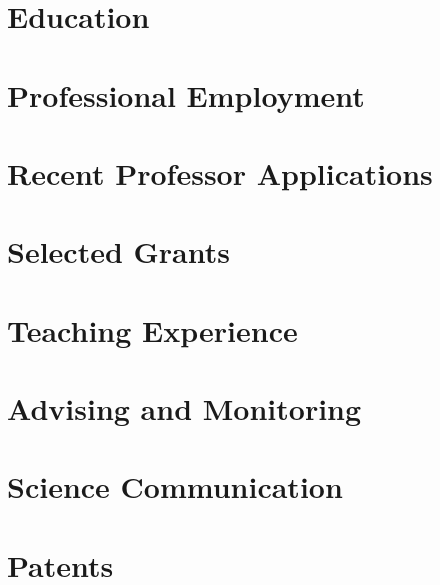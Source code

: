 \documentclass[a4paper,12pt]{article}
\begin{document}



\section{Education}



\section{Professional Employment}



\section{Recent Professor Applications}

%
\section{Selected Grants}


\section{Teaching Experience}
%







\section{Advising and Monitoring}



\section{Science Communication}



\section{Patents}

\end{document}
